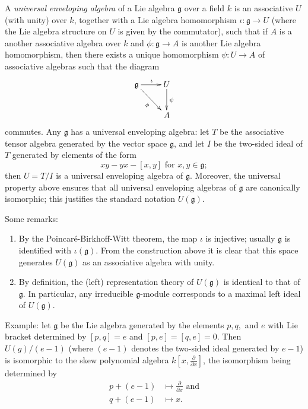 \documentclass[12pt]{article}
\begin{document}
A {\em universal enveloping algebra} of a Lie algebra $\mathfrak{g}$ over
a field $k$ is an associative  $U$ (with unity) over $k$, together
with a Lie algebra homomorphism $\iota:\mathfrak{g} \rightarrow U$ (where
the Lie algebra structure on $U$ is given by the commutator), such that
if $A$ is a another associative algebra over $k$ and $\phi:\mathfrak{g}
\rightarrow A$ is another Lie algebra homomorphism, then there exists a
unique homomorphism $\psi:U \rightarrow A$ of associative algebras such
that the diagram
\[\xymatrix{
  \mathfrak{g} \ar[dr]_\phi \ar[r]^\iota & U \ar[d]^\psi\\
                                         & A}
\]
commutes. Any $\mathfrak{g}$ has a universal enveloping algebra: let
$T$ be the associative tensor algebra generated by the vector space
$\mathfrak{g}$, and let $I$ be the two-sided ideal of $T$ generated by
elements of the form
\[ xy-yx-[x,y] \text{ for } x,y \in \mathfrak{g}; \]
then $U=T/I$ is a universal enveloping algebra of $\mathfrak{g}$.
Moreover, the universal property above ensures that all universal
enveloping algebras of $\mathfrak{g}$ are canonically isomorphic; this
justifies the standard notation $U(\mathfrak{g})$.

Some remarks:
\begin{enumerate}
\item By the Poincar\'e-Birkhoff-Witt theorem, the map $\iota$ is
injective; usually $\mathfrak{g}$ is identified with
$\iota(\mathfrak{g})$. From the construction above it is clear that
this space generates $U(\mathfrak{g})$ as an associative algebra with
unity.
\item By definition, the (left) representation theory of $U(\mathfrak{g})$
is identical to that of $\mathfrak{g}$. In particular, any irreducible
$\mathfrak{g}$-module corresponds to a maximal left ideal of
$U(\mathfrak{g})$.
\end{enumerate}
Example: let $\mathfrak{g}$ be the Lie algebra generated by the
elements $p,q,$ and $e$ with Lie bracket determined by $[p,q]=e$ and
$[p,e]=[q,e]=0$. Then $U(g)/(e-1)$ (where $(e-1)$ denotes the two-sided
ideal generated by $e-1$) is isomorphic to the skew polynomial algebra
$k[x,\frac{\partial}{\partial x}]$, the isomorphism being determined by
\begin{align*}
        p + (e-1) &\mapsto \frac{\partial}{\partial x} \text{ and}\\
        q + (e-1) &\mapsto x.
\end{align*}
\end{document}
